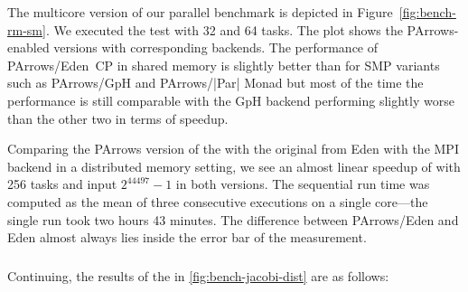 The multicore version of our parallel \rmtest benchmark is depicted in
Figure~\ref{fig:bench-rm-sm}. We executed the test with 32 and 64
tasks. The plot shows the PArrows-enabled versions with corresponding backends.
The performance of PArrows/Eden~CP in shared memory is slightly better than
for SMP variants such as PArrows/GpH and PArrows/|Par|
Monad but most of the time the performance is still comparable with the GpH backend performing slightly worse than the other two in terms of speedup.

Comparing the PArrows version of the \rmtest with the original from Eden with the MPI backend in a distributed memory setting, we see an almost linear speedup of
\rmtest with 256 tasks and input $2^{44497}-1$ in both versions. The sequential run time
was computed as the mean of three consecutive executions on a single
core---the single run took two hours 43 minutes. The difference between
PArrows/Eden and Eden almost always lies inside the error bar of
the measurement.


\subsubsection{\jacobitest}

Continuing, the results of the \jacobitest in \ref{fig:bench-jacobi-dist} are as follows:

\newcommand{\speedupJacobiDist}[4]{
\speedupplot{Speedup of \jacobitest ``#2''}{PArrows}{256}{#3}{
\addplot [mark=*,very thick,blue] table [scatter, x="nCores", y="speedup", col sep=comma, mark=none,
smooth]{benchmarks/distributed-jacobi/bench-jacobi.bench.jacobi-parr-#1-#2.csv};
}{#4}{\plotwidthDist}
}

